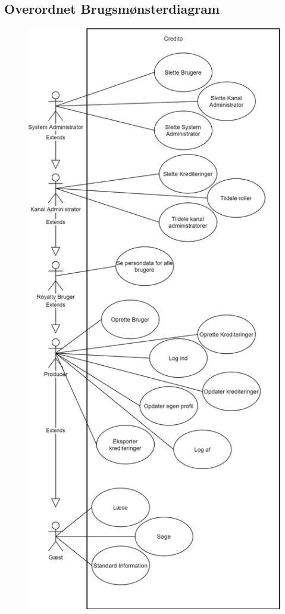 \subsection{Overordnet Brugsmønsterdiagram}

\begin{figure}[H]
    \centering
    \captionsetup{justification=centering}
    \includegraphics[scale=0.22]{figures/use-case.png}

\end{figure}
